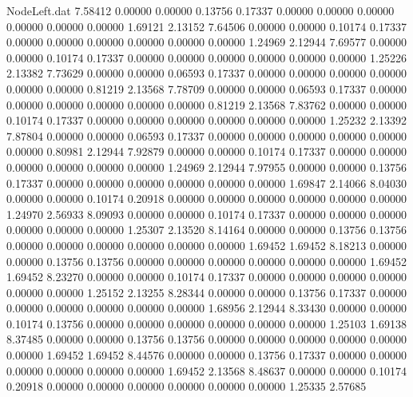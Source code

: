 \begin{filecontents}{NodeLeft.dat}
   7.58412    0.00000    0.00000     0.13756    0.17337    0.00000    0.00000    0.00000    0.00000    0.00000    0.00000    1.69121    2.13152
   7.64506    0.00000    0.00000     0.10174    0.17337    0.00000    0.00000    0.00000    0.00000    0.00000    0.00000    1.24969    2.12944
   7.69577    0.00000    0.00000     0.10174    0.17337    0.00000    0.00000    0.00000    0.00000    0.00000    0.00000    1.25226    2.13382
   7.73629    0.00000    0.00000     0.06593    0.17337    0.00000    0.00000    0.00000    0.00000    0.00000    0.00000    0.81219    2.13568
   7.78709    0.00000    0.00000     0.06593    0.17337    0.00000    0.00000    0.00000    0.00000    0.00000    0.00000    0.81219    2.13568
   7.83762    0.00000    0.00000     0.10174    0.17337    0.00000    0.00000    0.00000    0.00000    0.00000    0.00000    1.25232    2.13392
   7.87804    0.00000    0.00000     0.06593    0.17337    0.00000    0.00000    0.00000    0.00000    0.00000    0.00000    0.80981    2.12944
   7.92879    0.00000    0.00000     0.10174    0.17337    0.00000    0.00000    0.00000    0.00000    0.00000    0.00000    1.24969    2.12944
   7.97955    0.00000    0.00000     0.13756    0.17337    0.00000    0.00000    0.00000    0.00000    0.00000    0.00000    1.69847    2.14066
   8.04030    0.00000    0.00000     0.10174    0.20918    0.00000    0.00000    0.00000    0.00000    0.00000    0.00000    1.24970    2.56933
   8.09093    0.00000    0.00000     0.10174    0.17337    0.00000    0.00000    0.00000    0.00000    0.00000    0.00000    1.25307    2.13520
   8.14164    0.00000    0.00000     0.13756    0.13756    0.00000    0.00000    0.00000    0.00000    0.00000    0.00000    1.69452    1.69452
   8.18213    0.00000    0.00000     0.13756    0.13756    0.00000    0.00000    0.00000    0.00000    0.00000    0.00000    1.69452    1.69452
   8.23270    0.00000    0.00000     0.10174    0.17337    0.00000    0.00000    0.00000    0.00000    0.00000    0.00000    1.25152    2.13255
   8.28344    0.00000    0.00000     0.13756    0.17337    0.00000    0.00000    0.00000    0.00000    0.00000    0.00000    1.68956    2.12944
   8.33430    0.00000    0.00000     0.10174    0.13756    0.00000    0.00000    0.00000    0.00000    0.00000    0.00000    1.25103    1.69138
   8.37485    0.00000    0.00000     0.13756    0.13756    0.00000    0.00000    0.00000    0.00000    0.00000    0.00000    1.69452    1.69452
   8.44576    0.00000    0.00000     0.13756    0.17337    0.00000    0.00000    0.00000    0.00000    0.00000    0.00000    1.69452    2.13568
   8.48637    0.00000    0.00000     0.10174    0.20918    0.00000    0.00000    0.00000    0.00000    0.00000    0.00000    1.25335    2.57685

\end{filecontents}
